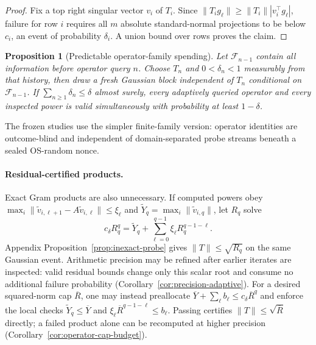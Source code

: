 \documentclass{article}
\newtheorem{proposition}{Proposition}
\begin{document}
\begin{proof}
Fix a top right singular vector $v_i$ of $T_i$.  Since
$\|T_i g_\ell\|\ge\|T_i\||v_i^\top g_\ell|$, failure for row $i$ requires all
$m$ absolute standard-normal projections to be below $c_i$, an event of
probability $\delta_i$.  A union bound over rows proves the claim.
\end{proof}

\begin{proposition}[Predictable operator-family spending]
\label{prop:predictable}
Let $\mathcal F_{n-1}$ contain all information before operator query $n$.
Choose $T_n$ and $0<\delta_n<1$ measurably from that history, then draw a fresh
Gaussian block independent of $T_n$ conditional on $\mathcal F_{n-1}$.  If
$\sum_{n\ge1}\delta_n\le\delta$ almost surely, every adaptively queried
operator and every inspected power is valid simultaneously with probability at
least $1-\delta$.
\end{proposition}

The frozen studies use the simpler finite-family version: operator identities
are outcome-blind and independent of domain-separated probe streams beneath a
sealed OS-random nonce.

\paragraph{Residual-certified products.}
Exact Gram products are also unnecessary.  If computed powers obey
$\max_i\|\widetilde v_{i,\ell+1}-A\widetilde v_{i,\ell}\|\le\xi_\ell$ and
$\widetilde Y_q=\max_i\|\widetilde v_{i,q}\|$, let $R_q$ solve
\begin{equation}
 c_\delta R_q^q=\widetilde Y_q+
 \sum_{\ell=0}^{q-1}\xi_\ell R_q^{q-1-\ell}.
 \label{eq:main-inexact-gram}
\end{equation}
Appendix Proposition~\ref{prop:inexact-probe} gives
$\|T\|\le\sqrt{R_q}$ on the same Gaussian event.  Arithmetic precision may be
refined after earlier iterates are inspected: valid residual bounds change only
this scalar root and consume no additional failure probability
(Corollary~\ref{cor:precision-adaptive}).
For a desired squared-norm cap $\overline R$, one may instead preallocate
$\overline Y+\sum_\ell b_\ell\le c_\delta\overline R^q$ and enforce the local
checks $\widetilde Y_q\le\overline Y$ and
$\xi_\ell\overline R^{q-1-\ell}\le b_\ell$.  Passing certifies
$\|T\|\le\sqrt{\overline R}$ directly; a failed product alone can be recomputed
at higher precision (Corollary~\ref{cor:operator-cap-budget}).
\end{document}

